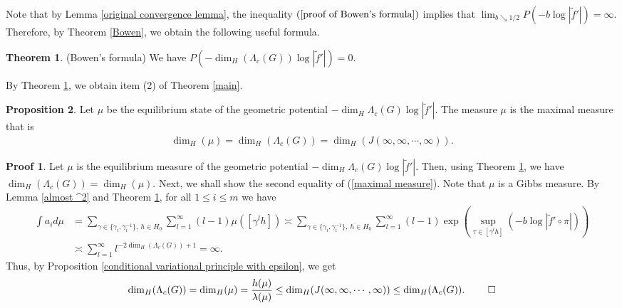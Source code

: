 \documentclass{article}
\theoremstyle{definition}
\newtheorem{thm}{Theorem}[section]
\newtheorem{prop}[thm]{Proposition}
\newtheorem*{pf}{Proof}
\begin{document}
Note that by Lemma \ref{original convergence lemma}, the inequality $(\ref{proof of Bowen's formula})$ implies that $\lim_{b\searrow 1/2}P(-b\log|\tilde f'|)=\infty$. Therefore, by Theorem \ref{Bowen}, we obtain the following useful formula.

\begin{thm}\label{useful Bowen}(Bowen's formula)
    We have $P(-\dim_H(\Lambda_c(G))\log|\tilde f'|)=0$.  
\end{thm}
By Theorem \ref{useful Bowen}, we obtain item (2) of Theorem \ref{main}.
\begin{prop}\label{prop item (2)}
    Let $\mu$ be the equilibrium state of the geometric potential $-\dim_H{\Lambda_{c}(G)}\log |\tilde f'|$. The measure $\mu$ is the maximal measure that is 
    \begin{align}\label{maximal measure}
        \dim_H(\mu)=\dim_H(\Lambda_c(G))=\dim_H(J(\infty,\infty,\cdots,\infty)).
    \end{align}
\end{prop}
\begin{pf}
   Let $\mu$ is the equilibrium measure of the geometric potential $-\dim_H{\Lambda_{c}(G)}\log |\tilde f'|$. Then, using Theorem \ref{useful Bowen}, we have 
$\dim_H(\Lambda_c(G))=\dim_H(\mu)$. 
Next, we shall show the second equality of (\ref{maximal measure}). Note that $\mu$ is a Gibbs measure. By Lemma \ref{almost ^2} and Theorem \ref{useful Bowen}, for all $1\leq i\leq m$ we have
\begin{align*}
    \int a_i d\mu&=\sum_{\gamma \in \{\gamma_i,\gamma_{i}^{-1}\},\ h\in H_0}\sum_{l=1}^{\infty}(l-1)\mu([\gamma^lh])\asymp\sum_{\gamma \in \{\gamma_i,\gamma_i^{-1}\},\ h\in H_0}\sum_{l=1}^{\infty}(l-1)\exp\left(\sup_{\tau\in[\gamma^lh]}(-b\log|\tilde f'\circ\pi|)\right)\\&\asymp\sum_{l=1}^\infty l^{-2\dim_H(\Lambda_c(G))+1}=\infty.
\end{align*}
Thus, by Proposition \ref{conditional variational principle with epsilon}, we get
\begin{align*}
    \dim_H(\Lambda_c(G))=\dim_H(\mu)=\frac{h(\mu)}{\lambda(\mu)}\leq \dim_H(J(\infty,\infty,\cdots,\infty))\leq\dim_H(\Lambda_c(G)).\ \qed
\end{align*}
\end{pf}
\end{document}
